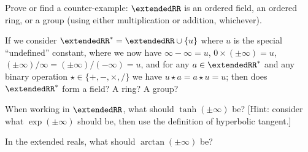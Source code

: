\begin{xca}
  Prove or find a counter-example: $\extendedRR$ is an ordered field, an
  ordered ring, or a group (using either multiplication or addition, whichever).
\end{xca}
\begin{xca}
  If we consider $\extendedRR^{*}=\extendedRR\cup\{u\}$ where $u$ is the
  special ``undefined'' constant, where we now have $\infty-\infty=u$,
  $0\times(\pm\infty)=u$, $(\pm\infty)/\infty=(\pm\infty)/(-\infty)=u$,
  and for any $a\in\extendedRR^{*}$ and any binary operation
  $\star\in\{+,-,\times,/\}$ we have $u\star a = a\star u = u$;
  then does $\extendedRR^{*}$ form a field? A ring? A group?
\end{xca}
\begin{xca}
  When working in $\extendedRR$, what should $\tanh(\pm\infty)$ be?
  [Hint: consider what $\exp(\pm\infty)$ should be, then use the
    definition of hyperbolic tangent.]
\end{xca}
\begin{xca}
  In the extended reals, what should $\arctan(\pm\infty)$ be?
\end{xca}

